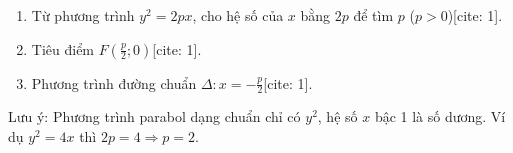 \begin{enumerate}
\item Từ phương trình $y^2 = 2px$, cho hệ số của $x$ bằng $2p$ để tìm $p$ ($p > 0$)[cite: 1].
\item Tiêu điểm $F\left(\frac{p}{2}; 0\right)$[cite: 1].
\item Phương trình đường chuẩn $\Delta: x = -\frac{p}{2}$[cite: 1].
\end{enumerate}
Lưu ý: Phương trình parabol dạng chuẩn chỉ có $y^2$, hệ số $x$ bậc 1 là số dương. Ví dụ $y^2 = 4x$ thì $2p = 4 \Rightarrow p = 2$.
